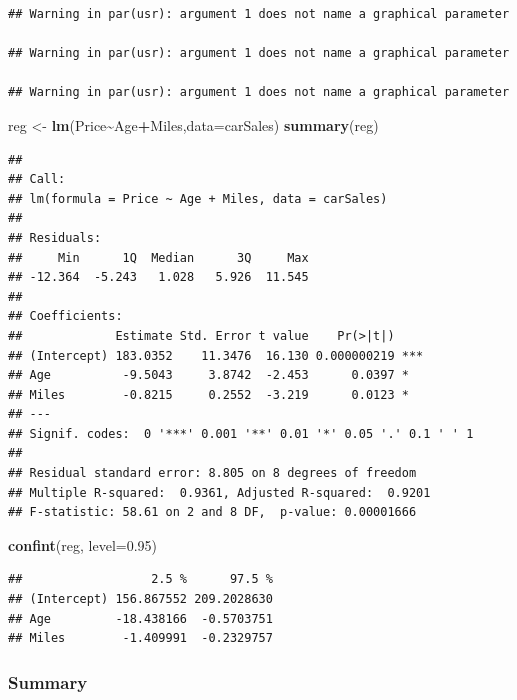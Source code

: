 \documentclass[
]{article}
\newenvironment{Shaded}{\begin{snugshade}}{\end{snugshade}}
\newcommand{\AttributeTok}[1]{\textcolor[rgb]{0.13,0.29,0.53}{#1}}
\newcommand{\FloatTok}[1]{\textcolor[rgb]{0.00,0.00,0.81}{#1}}
\newcommand{\FunctionTok}[1]{\textcolor[rgb]{0.13,0.29,0.53}{\textbf{#1}}}
\newcommand{\NormalTok}[1]{#1}
\newcommand{\OtherTok}[1]{\textcolor[rgb]{0.56,0.35,0.01}{#1}}
\newcommand{\SpecialCharTok}[1]{\textcolor[rgb]{0.81,0.36,0.00}{\textbf{#1}}}
\begin{document}
\begin{verbatim}
## Warning in par(usr): argument 1 does not name a graphical parameter

## Warning in par(usr): argument 1 does not name a graphical parameter

## Warning in par(usr): argument 1 does not name a graphical parameter
\end{verbatim}


\begin{Shaded}
\begin{Highlighting}[]
\NormalTok{reg }\OtherTok{\textless{}{-}} \FunctionTok{lm}\NormalTok{(Price}\SpecialCharTok{\textasciitilde{}}\NormalTok{Age}\SpecialCharTok{+}\NormalTok{Miles,}\AttributeTok{data=}\NormalTok{carSales)}
\FunctionTok{summary}\NormalTok{(reg)}
\end{Highlighting}
\end{Shaded}

\begin{verbatim}
## 
## Call:
## lm(formula = Price ~ Age + Miles, data = carSales)
## 
## Residuals:
##     Min      1Q  Median      3Q     Max 
## -12.364  -5.243   1.028   5.926  11.545 
## 
## Coefficients:
##             Estimate Std. Error t value    Pr(>|t|)    
## (Intercept) 183.0352    11.3476  16.130 0.000000219 ***
## Age          -9.5043     3.8742  -2.453      0.0397 *  
## Miles        -0.8215     0.2552  -3.219      0.0123 *  
## ---
## Signif. codes:  0 '***' 0.001 '**' 0.01 '*' 0.05 '.' 0.1 ' ' 1
## 
## Residual standard error: 8.805 on 8 degrees of freedom
## Multiple R-squared:  0.9361, Adjusted R-squared:  0.9201 
## F-statistic: 58.61 on 2 and 8 DF,  p-value: 0.00001666
\end{verbatim}

\begin{Shaded}
\begin{Highlighting}[]
\FunctionTok{confint}\NormalTok{(reg, }\AttributeTok{level=}\FloatTok{0.95}\NormalTok{)}
\end{Highlighting}
\end{Shaded}

\begin{verbatim}
##                  2.5 %      97.5 %
## (Intercept) 156.867552 209.2028630
## Age         -18.438166  -0.5703751
## Miles        -1.409991  -0.2329757
\end{verbatim}

\hypertarget{summary}{%
\subsubsection{Summary}\label{summary}}
\end{document}
